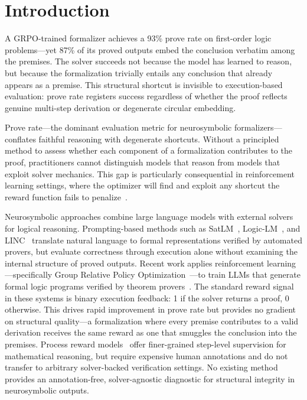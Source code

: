 \section{Introduction}
\label{sec:introduction}

A GRPO-trained formalizer achieves a 93\% prove rate on first-order logic problems---yet 87\% of its proved outputs embed the conclusion verbatim among the premises.
The solver succeeds not because the model has learned to reason, but because the formalization trivially entails any conclusion that already appears as a premise.
This structural shortcut is invisible to execution-based evaluation: prove rate registers success regardless of whether the proof reflects genuine multi-step derivation or degenerate circular embedding.

Prove rate---the dominant evaluation metric for neurosymbolic formalizers---conflates faithful reasoning with degenerate shortcuts.
Without a principled method to assess whether each component of a formalization contributes to the proof, practitioners cannot distinguish models that reason from models that exploit solver mechanics.
This gap is particularly consequential in reinforcement learning settings, where the optimizer will find and exploit any shortcut the reward function fails to penalize~\citep{skalse-reward-hacking, reward-hacking-survey}.

Neurosymbolic approaches combine large language models with external solvers for logical reasoning.
Prompting-based methods such as SatLM~\citep{satlm}, Logic-LM~\citep{logic-lm}, and LINC~\citep{linc} translate natural language to formal representations verified by automated provers, but evaluate correctness through execution alone without examining the internal structure of proved outputs.
Recent work applies reinforcement learning---specifically Group Relative Policy Optimization~\citep[GRPO;][]{deepseekmath}---to train LLMs that generate formal logic programs verified by theorem provers~\citep{mellgren-prolog-grpo, logic-rl}.
The standard reward signal in these systems is binary execution feedback: 1 if the solver returns a proof, 0 otherwise.
This drives rapid improvement in prove rate but provides no gradient on structural quality---a formalization where every premise contributes to a valid derivation receives the same reward as one that smuggles the conclusion into the premises.
Process reward models~\citep{lightman-verify-step} offer finer-grained step-level supervision for mathematical reasoning, but require expensive human annotations and do not transfer to arbitrary solver-backed verification settings.
No existing method provides an annotation-free, solver-agnostic diagnostic for structural integrity in neurosymbolic outputs.

